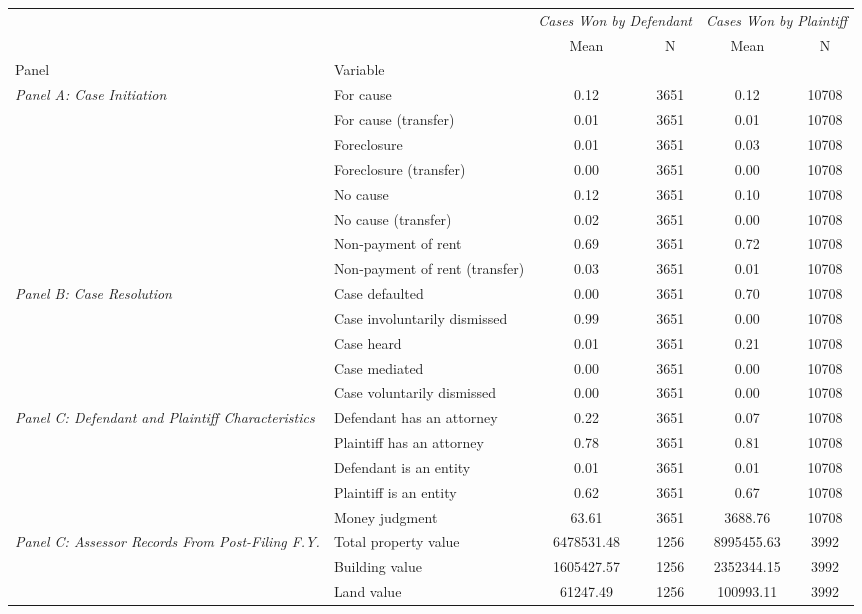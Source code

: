 \begin{tabular}{llcccc}
\toprule
 &  & \multicolumn{2}{c}{\textit{Cases Won by Defendant}} & \multicolumn{2}{c}{\textit{Cases Won by Plaintiff}} \\
 &  & Mean & N & Mean & N \\
Panel & Variable &  &  &  &  \\
\midrule
\multirow[c]{8}{4cm}{\textit{Panel A: Case Initiation}} & For cause & 0.12 & 3651 & 0.12 & 10708 \\
 & For cause (transfer) & 0.01 & 3651 & 0.01 & 10708 \\
 & Foreclosure & 0.01 & 3651 & 0.03 & 10708 \\
 & Foreclosure (transfer) & 0.00 & 3651 & 0.00 & 10708 \\
 & No cause & 0.12 & 3651 & 0.10 & 10708 \\
 & No cause (transfer) & 0.02 & 3651 & 0.00 & 10708 \\
 & Non-payment of rent & 0.69 & 3651 & 0.72 & 10708 \\
 & Non-payment of rent (transfer) & 0.03 & 3651 & 0.01 & 10708 \\
\cline{1-6}
\multirow[c]{5}{4cm}{\textit{Panel B: Case Resolution}} & Case defaulted & 0.00 & 3651 & 0.70 & 10708 \\
 & Case involuntarily dismissed & 0.99 & 3651 & 0.00 & 10708 \\
 & Case heard & 0.01 & 3651 & 0.21 & 10708 \\
 & Case mediated & 0.00 & 3651 & 0.00 & 10708 \\
 & Case voluntarily dismissed & 0.00 & 3651 & 0.00 & 10708 \\
\cline{1-6}
\multirow[c]{5}{4cm}{\textit{Panel C: Defendant and Plaintiff Characteristics}} & Defendant has an attorney & 0.22 & 3651 & 0.07 & 10708 \\
 & Plaintiff has an attorney & 0.78 & 3651 & 0.81 & 10708 \\
 & Defendant is an entity & 0.01 & 3651 & 0.01 & 10708 \\
 & Plaintiff is an entity & 0.62 & 3651 & 0.67 & 10708 \\
 & Money judgment & 63.61 & 3651 & 3688.76 & 10708 \\
\cline{1-6}
\multirow[c]{5}{4cm}{\textit{Panel C: Assessor Records From Post-Filing F.Y.}} & Total property value & 6478531.48 & 1256 & 8995455.63 & 3992 \\
 & Building value & 1605427.57 & 1256 & 2352344.15 & 3992 \\
 & Land value & 61247.49 & 1256 & 100993.11 & 3992 \\

\end{tabular}
